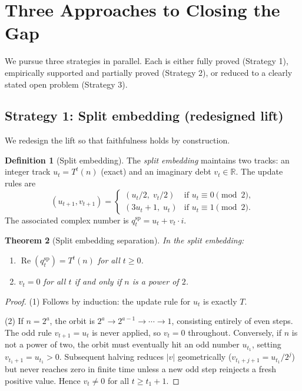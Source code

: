 \documentclass[12pt,reqno]{amsart}
\theoremstyle{plain}
\newtheorem{theorem}{Theorem}[section]
\theoremstyle{definition}
\newtheorem{definition}[theorem]{Definition}
\theoremstyle{remark}
\newcommand{\RR}{\mathbb{R}}
\begin{document}
\section{Three Approaches to Closing the Gap}
\label{sec:approaches}

We pursue three strategies in parallel.  Each is either fully proved
(Strategy 1), empirically supported and partially proved (Strategy 2),
or reduced to a clearly stated open problem (Strategy 3).

\subsection{Strategy 1: Split embedding (redesigned lift)}
\label{sec:split}

We redesign the lift so that faithfulness holds by construction.

\begin{definition}[Split embedding]
\label{def:split}
The \emph{split embedding} maintains two tracks:
an integer track $u_t = T^t(n)$ (exact) and an imaginary debt $v_t \in \RR$.
The update rules are
\[
  (u_{t+1}, v_{t+1}) =
  \begin{cases}
    (u_t/2,\; v_t/2) & \text{if } u_t \equiv 0 \pmod{2},\\
    (3u_t + 1,\; u_t) & \text{if } u_t \equiv 1 \pmod{2}.
  \end{cases}
\]
The associated complex number is $q_t^{\mathrm{sp}} = u_t + v_t \cdot i$.
\end{definition}

\begin{theorem}[Split embedding separation]
\label{thm:split}
In the split embedding:
\begin{enumerate}
  \item $\operatorname{Re}(q_t^{\mathrm{sp}}) = T^t(n)$ for all $t \geq 0$.
  \item $v_t = 0$ for all $t$ if and only if $n$ is a power of $2$.
\end{enumerate}
\end{theorem}

\begin{proof}
(1) Follows by induction: the update rule for $u_t$ is exactly $T$.

(2) If $n = 2^a$, the orbit is $2^a \to 2^{a-1} \to \cdots \to 1$,
consisting entirely of even steps.  The odd rule $v_{t+1} = u_t$ is
never applied, so $v_t = 0$ throughout.  Conversely, if $n$ is not a
power of two, the orbit must eventually hit an odd number $u_{t_1}$,
setting $v_{t_1+1} = u_{t_1} > 0$.  Subsequent halving reduces $|v|$
geometrically ($v_{t_1+j+1} = u_{t_1}/2^j$) but never reaches zero in
finite time unless a new odd step reinjects a fresh positive value.
Hence $v_t \neq 0$ for all $t \geq t_1 + 1$.
\end{proof}
\end{document}
